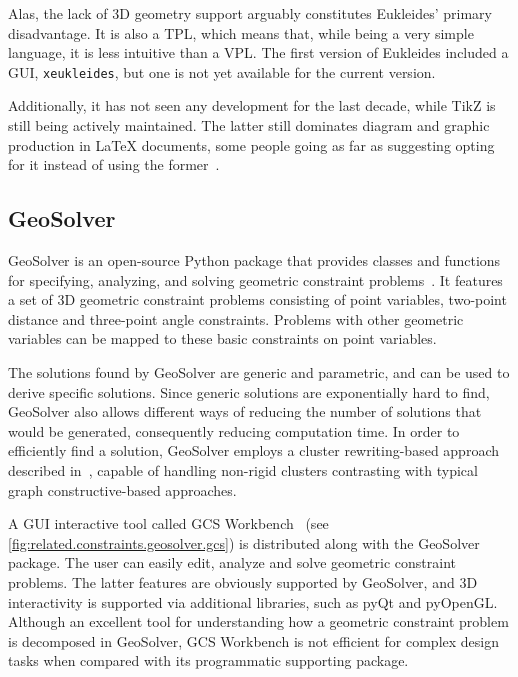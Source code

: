 Alas, the lack of 3D geometry support arguably constitutes Eukleides' primary
disadvantage.  It is also a \ac{TPL}, which means that, while being a very
simple language, it is less intuitive than a \ac{VPL}.  The first version of
Eukleides included a \ac{GUI}, \texttt{xeukleides}, but one is not yet available
for the current version.

Additionally, it has not seen any development for the last decade, while
\ac{TikZ} is still being actively maintained.  The latter still dominates
diagram and graphic production in \LaTeX{} documents, some people going as far
as suggesting opting for it instead of using the
former~\cite{Christian:2014:TEXE:Eukleides}.

\subsection{GeoSolver}%
\label{sec:related.constraints.geosolver}

GeoSolver is an open-source Python package that provides classes and functions
for specifying, analyzing, and solving geometric constraint
problems~\cite{Van:2009:GeoSolver}.  It features a set of 3D geometric
constraint problems consisting of point variables, two-point distance and
three-point angle constraints.  Problems with other geometric variables can be
mapped to these basic constraints on point variables.

The solutions found by GeoSolver are generic and parametric, and can be used to
derive specific solutions.  Since generic solutions are exponentially hard to
find, GeoSolver also allows different ways of  reducing the number of solutions
that would be generated, consequently reducing computation time.  In order to
efficiently find a solution, GeoSolver employs a cluster rewriting-based
approach described in~\cite{Van:2009:NRCRASSGC}, capable of handling non-rigid
clusters contrasting with typical graph constructive-based approaches.

A \ac{GUI} interactive tool called \ac{GCS} Workbench~\cite{DeRegt:2008:WGCS}
(see \cref{fig:related.constraints.geosolver.gcs}) is distributed along with the
GeoSolver package.  The user can easily edit, analyze and solve geometric
constraint problems.  The latter features are obviously supported by GeoSolver,
and 3D interactivity is supported via additional libraries, such as pyQt and
pyOpenGL\@.  Although an excellent tool for understanding how a geometric
constraint problem is decomposed in GeoSolver, \ac{GCS} Workbench is not
efficient for complex design tasks when compared with its programmatic
supporting package.


